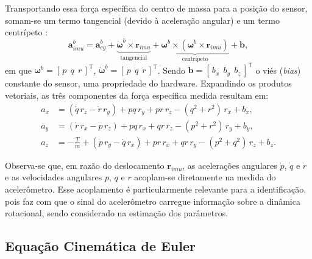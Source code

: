 Transportando essa força específica do centro de massa para a posição do sensor, somam-se um termo tangencial (devido à aceleração angular) e um termo centrípeto \cite{Tischler2012}:
\begin{equation}
    \mathbf{a}_{imu}^{b} = \mathbf{a}_{cg}^{b}
    + \underbrace{\dot{\boldsymbol{\omega}}^{b} \times \mathbf{r}_{imu}}_{\text{tangencial}}
    + \underbrace{\boldsymbol{\omega}^{b} \times \left(\boldsymbol{\omega}^{b} \times \mathbf{r}_{imu}\right)}_{\text{centrípeto}}
    + \mathbf{b},
    \label{eq:acc-imu}
\end{equation}
em que $\boldsymbol{\omega}^{b} = [\,p\ \ q\ \ r\,]^{\mathsf{T}}$, $\dot{\boldsymbol{\omega}}^{b} = [\,\dot p\ \ \dot q\ \ \dot r\,]^{\mathsf{T}}$. Sendo $\mathbf{b} = [\,b_x\ \ b_y\ \ b_z\,]^{\mathsf{T}}$ o viés (\textit{bias}) constante do sensor, uma propriedade do hardware. Expandindo os produtos vetoriais, as três componentes da força específica medida resultam em:
\begin{align}
    a_x &= (\dot q\, r_z - \dot r\, r_y) + p q\, r_y + p r\, r_z - (q^2 + r^2)\, r_x + b_x, \label{eq:acc-x} \\
    a_y &= (\dot r\, r_x - \dot p\, r_z) + p q\, r_x + q r\, r_z - (p^2 + r^2)\, r_y + b_y, \label{eq:acc-y} \\
    a_z &= -\frac{T}{m} + (\dot p\, r_y - \dot q\, r_x) + p r\, r_x + q r\, r_y - (p^2 + q^2)\, r_z + b_z. \label{eq:acc-z}
\end{align}

Observa-se que, em razão do deslocamento $\mathbf{r}_{imu}$, as acelerações angulares $\dot p$, $\dot q$ e $\dot r$ e as velocidades angulares $p$, $q$ e $r$ acoplam-se diretamente na medida do acelerômetro. Esse acoplamento é particularmente relevante para a identificação, pois faz com que o sinal do acelerômetro carregue informação sobre a dinâmica rotacional, sendo considerado na estimação dos parâmetros.

\subsection{Equação Cinemática de Euler}

